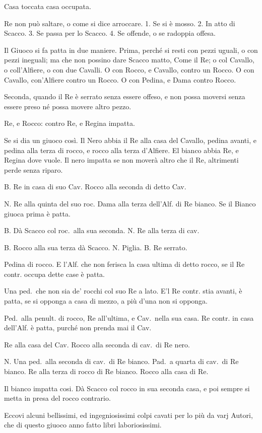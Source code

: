 \documentclass[11pt,a6paper]{article}
\begin{document}
Casa toccata casa occupata.

Re non può saltare, o come si dice arroccare.
1. Se si è mosso. 2. In atto di Scacco.
3. Se passa per lo Scacco. 4. Se offende, o se
radoppia offesa.

Il Giuoco si fa patta in due maniere. Prima,
perché si resti con pezzi uguali, o con pezzi
ineguali; ma che non possino dare Scacco
matto, Come il Re; o col Cavallo, o
coll'Alfiere, o con due Cavalli. O con Rocco, e
Cavallo, contro un Rocco. O con Cavallo,
con'Alfiere contro un Rocco. O con Pedina,
e Dama contro Rocco.

Seconda, quando il Re è serrato senza
essere offeso, e non possa moversi senza essere
preso né possa movere altro pezzo.

Re, e Rocco: contro Re, e Regina impatta.

Se si dia un giuoco così. Il Nero abbia il
Re alla casa del Cavallo, pedina avanti, e
pedina alla terza di rocco, e rocco alla terza
d'Alfiere. El bianco abbia Re, e Regina dove
vuole. Il nero impatta se non moverà altro
che il Re, altrimenti perde senza riparo.

B. Re in casa di suo Cav. Rocco alla seconda di detto Cav.

N. Re alla quinta del suo roc. Dama alla
terza dell'Alf. di Re bianco. Se il Bianco
giuoca prima è patta.

B. Dà Scacco col roc.\ alla sua seconda.
N. Re alla terza di cav.

B. Rocco alla sua terza dà Scacco. N. Piglia.
B. Re serrato.

Pedina di rocco. E l'Alf. che non ferisca
la casa ultima di detto rocco, se il Re contr.
occupa dette case è patta.

Una ped.\ che non sia de' rocchi col suo
Re a lato. E'l Re contr. stia avanti, è patta,
se si opponga a casa di mezzo, a più d'una
non si opponga.

Ped.\ alla penult. di rocco, Re all'ultima,
e Cav.\ nella sua casa. Re contr. in casa
dell'Alf. è patta, purché non prenda mai il Cav.

Re alla casa del Cav. Rocco alla seconda
di cav.\ di Re nero.

N. Una ped.\ alla seconda di cav.\ di Re
bianco. Pad.\ a quarta di cav.\ di Re bianco.
Re alla terza di rocco di Re bianco. Rocco
alla casa di Re.

Il bianco impatta cosi. Dà Scacco col rocco
in sua seconda casa, e poi sempre si metta
in presa del rocco contrario.

Eccovi alcuni bellissimi, ed ingegniosissimi
colpi cavati per lo più da varj Autori, che
di questo giuoco anno fatto libri laboriosissimi.
\end{document}
